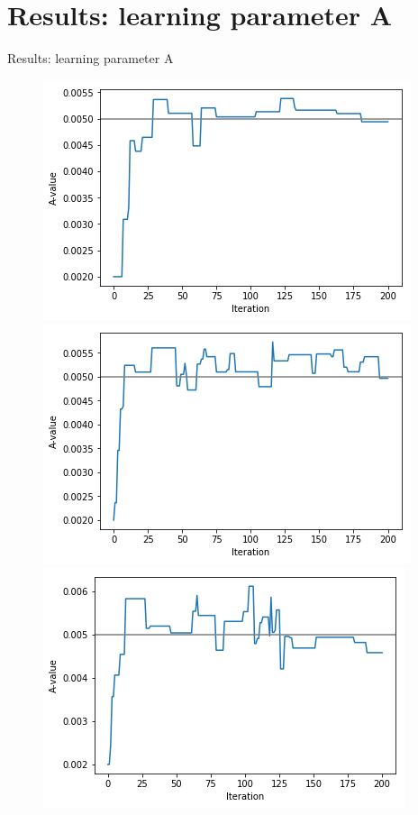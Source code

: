 \documentclass[aspectratio=169]{beamer}
\begin{document}
	\section{Results: learning parameter A}
	
	\begin{frame}{Results: learning parameter A}
	
	    \begin{figure}
	        \centering
	        \includegraphics[scale=0.4]{240_0.0001.png}
	        \includegraphics[scale=0.4]{240_0.0005.png}\\
	        \includegraphics[scale=0.4]{240_0.001.png}

\end{figure}
\end{frame}
\end{document}
